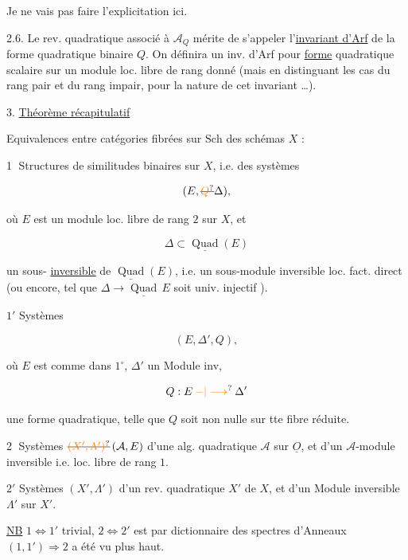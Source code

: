 Je ne vais pas faire l'explicitation ici.

2.6. Le rev. quadratique  associé à $\mathcal A_Q$ mérite de s'appeler l'\uline{invariant d'Arf} de la forme quadratique binaire $Q$. On définira un inv. d'Arf pour \uline{ forme} quadratique scalaire sur un module loc. libre de rang donné (mais en distinguant les cas du rang pair et du rang impair, pour la nature de cet invariant \ldots).

3. \uline{Théorème récapitulatif}

Equivalences entre  catégories fibrées sur  $\mathrm{Sch}$ des schémas $X$ :

\textcircled{1} Structures de similitudes binaires  sur $X$, i.e. des systèmes

\[
(E,\deleted{\unsure{Q}}\Delta),
\]

où $E$ est un module loc. libre de rang $2$ sur $X$, et

\[
\Delta\subset\underline{\operatorname{Quad}}(E)
\]

un sous- \uline{inversible} de $\underline{\operatorname{Quad}}(E)$, i.e. un sous-module inversible  loc. fact. direct (ou encore, tel que $\Delta\longrightarrow\underline{\operatorname{Quad}}\,E$ soit univ. injectif \unsure{--}).

\textcircled{$1'$} Systèmes

\[
(E,\Delta',Q),
\]

où $E$ est comme dans $1^\circ$, $\Delta'$ un Module inv,

\[
Q:E\mathbin{\unsure{-|\longrightarrow}}\Delta'
\]

une forme quadratique, telle que $Q$ soit non  nulle sur tte fibre réduite.

\textcircled{2} Systèmes $\deleted{\unsure{(X',\Lambda')}}\,(\mathcal A,E)$ d'une alg. quadratique $\mathcal A$ sur $\underline O$, et d'un $\mathcal A$-module inversible i.e. loc. libre de rang $1$.

\textcircled{$2'$} Systèmes $(X',\Lambda')$ d'un rev. quadratique $X'$ de $X$, et d'un Module inversible $\Lambda'$ sur $X'$.

\uline{NB} $1\Longleftrightarrow1'$ trivial, $2\Longleftrightarrow2'$ est  par dictionnaire des spectres d'Anneaux  $(1,1')\Longrightarrow2$ a été vu plus haut.

